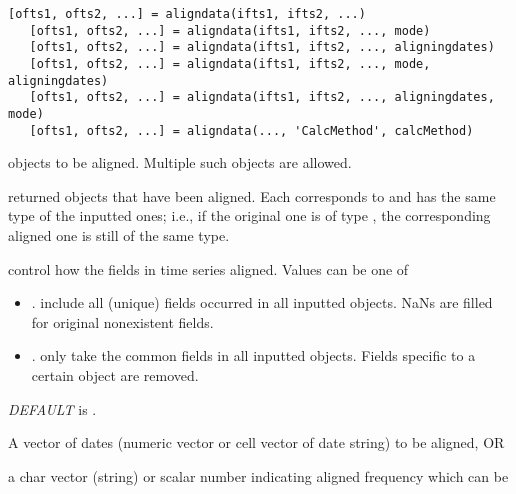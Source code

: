 \usage
%
   \begin{lstlisting}[numbers=none]
   [ofts1, ofts2, ...] = aligndata(ifts1, ifts2, ...)
   [ofts1, ofts2, ...] = aligndata(ifts1, ifts2, ..., mode)
   [ofts1, ofts2, ...] = aligndata(ifts1, ifts2, ..., aligningdates)
   [ofts1, ofts2, ...] = aligndata(ifts1, ifts2, ..., mode, aligningdates)
   [ofts1, ofts2, ...] = aligndata(ifts1, ifts2, ..., aligningdates, mode)
   [ofts1, ofts2, ...] = aligndata(..., 'CalcMethod', calcMethod)
   \end{lstlisting}
%
\where
%
   \begin{argdesc}
	   \item[ifts1, ifts2,...] 
                      \myfints{} objects to be aligned. Multiple such objects
                      are allowed.
	   \item[ofts1, ofts2,...] 
                      returned \myfints{} objects that have been aligned.
                      Each corresponds to and has the same type of the inputted ones;
                      i.e., if the original one is of type , 
                      the corresponding aligned one is still of the same type.
	   \item[mode]  
                      control how the fields in time series aligned.
	                   Values can be one of
	                   \begin{itemize}
	                      \item {}. include all (unique) fields occurred in all
	                                inputted \myfints{} objects. NaNs are filled
	                                for original nonexistent fields.
	                      \item {}. only take the common fields in all
	                                inputted \myfints{} objects. Fields specific
	                                to a certain \myfints{} object are removed.
                      \end{itemize}
	                   \emph{DEFAULT} is .
	   \item[aligningdates]
                      A vector of dates (numeric vector or cell vector of date
                      string) to be aligned,  OR\par
                      a char vector (string) or scalar number 
                      indicating aligned frequency
                      which can be
                      
                     

\end{argdesc}

